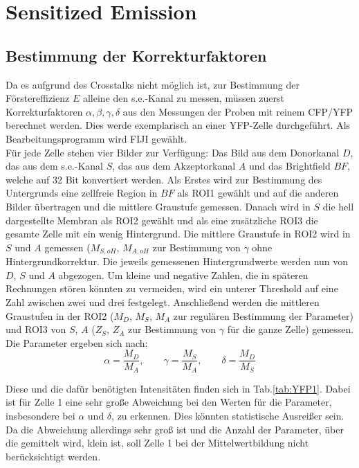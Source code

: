 

\section{Sensitized Emission}

\subsection{Bestimmung der Korrekturfaktoren}
\label{subs:korr}

Da es aufgrund des Crosstalks nicht möglich ist, zur Bestimmung der Förstereffizienz $E$ alleine den s.e.-Kanal zu messen, müssen zuerst 
Korrekturfaktoren $\alpha, \beta, \gamma, \delta$ aus den Messungen der Proben mit reinem CFP/YFP berechnet werden.
Dies werde exemplarisch an einer YFP-Zelle durchgeführt. Als Bearbeitungsprogramm wird FIJI gewählt. \footnotemark 
{}
\\
Für jede Zelle stehen vier Bilder zur Verfügung: Das Bild aus dem Donorkanal $D$, das aus dem s.e.-Kanal $S$, das aus dem 
Akzeptorkanal $A$ und das Brightfield $BF$, welche auf 32 Bit konvertiert werden. 
Als Erstes wird zur Bestimmung des Untergrunds eine zellfreie Region in $BF$ als ROI1 gewählt und 
auf die anderen Bilder übertragen und die mittlere Graustufe gemessen. Danach wird in $S$ die hell dargestellte Membran als ROI2 gewählt und 
als eine zusätzliche ROI3 die gesamte Zelle mit ein wenig Hintergrund. Die mittlere Graustufe in ROI2 wird in $S$ und $A$ gemessen 
($M_{S,oH}$, $M_{A,oH}$ zur 
Bestimmung von $\gamma$ ohne Hintergrundkorrektur. Die jeweils gemessenen Hintergrundwerte werden nun von $D$, $S$ und $A$ abgezogen. 
Um kleine und negative Zahlen, die in späteren Rechnungen stören könnten zu vermeiden, wird ein unterer Threshold auf eine Zahl zwischen 
zwei und drei festgelegt. Anschließend werden die mittleren Graustufen in der ROI2 ($M_D$, $M_S$, $M_A$ zur regulären Bestimmung 
der Parameter) und ROI3 von $S$, $A$ ($Z_S$, $Z_A$ zur Bestimmung von $\gamma$ für die ganze Zelle) gemessen. Die Parameter ergeben 
sich nach:
\begin{equation*}
    \alpha = \frac{M_D}{M_A}, \qquad
    \gamma = \frac{M_S}{M_A}, \qquad
    \delta = \frac{M_D}{M_S}
\end{equation*}

Diese und die dafür benötigten Intensitäten finden sich in Tab.\ref{tab:YFP1}. Dabei ist für Zelle 1 eine sehr große Abweichung bei den 
Werten für die Parameter, insbesondere bei $\alpha$ und $\delta$, zu erkennen. Dies könnten statistische Ausreißer sein. Da die Abweichung 
allerdings sehr groß ist und die Anzahl der Parameter, über die gemittelt wird, klein ist, soll Zelle 1 bei der Mittelwertbildung 
nicht berücksichtigt werden.

